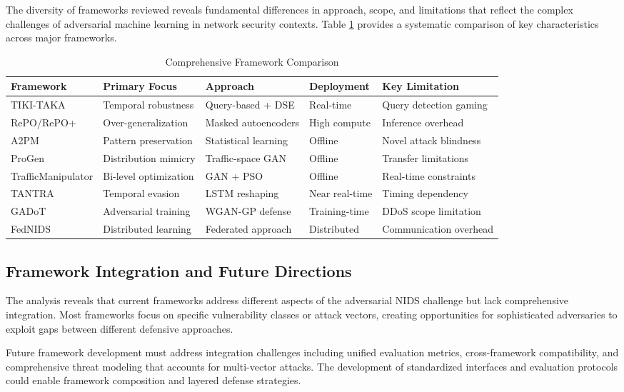 The diversity of frameworks reviewed reveals fundamental differences in approach, scope, and limitations that reflect the complex challenges of adversarial machine learning in network security contexts. Table \ref{tab:framework_comparison} provides a systematic comparison of key characteristics across major frameworks.

\begin{table}[htbp]
\centering
\caption{Comprehensive Framework Comparison}
\label{tab:framework_comparison}
\begin{tabular}{|l|l|l|l|l|}
\hline
\textbf{Framework} & \textbf{Primary Focus} & \textbf{Approach} & \textbf{Deployment} & \textbf{Key Limitation} \\
\hline
TIKI-TAKA & Temporal robustness & Query-based + DSE & Real-time & Query detection gaming \\
RePO/RePO+ & Over-generalization & Masked autoencoders & High compute & Inference overhead \\
A2PM & Pattern preservation & Statistical learning & Offline & Novel attack blindness \\
ProGen & Distribution mimicry & Traffic-space GAN & Offline & Transfer limitations \\
TrafficManipulator & Bi-level optimization & GAN + PSO & Offline & Real-time constraints \\
TANTRA & Temporal evasion & LSTM reshaping & Near real-time & Timing dependency \\
GADoT & Adversarial training & WGAN-GP defense & Training-time & DDoS scope limitation \\
FedNIDS & Distributed learning & Federated approach & Distributed & Communication overhead \\
\hline
\end{tabular}
\end{table}

\subsection{Framework Integration and Future Directions}

The analysis reveals that current frameworks address different aspects of the adversarial NIDS challenge but lack comprehensive integration. Most frameworks focus on specific vulnerability classes or attack vectors, creating opportunities for sophisticated adversaries to exploit gaps between different defensive approaches.

Future framework development must address integration challenges including unified evaluation metrics, cross-framework compatibility, and comprehensive threat modeling that accounts for multi-vector attacks. The development of standardized interfaces and evaluation protocols could enable framework composition and layered defense strategies.

